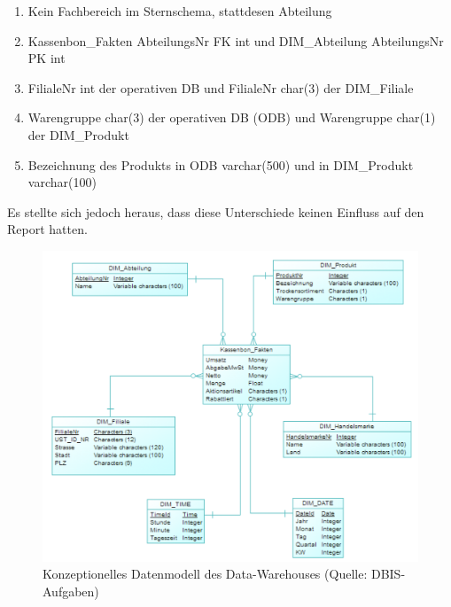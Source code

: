 \begin{enumerate}
  \item Kein Fachbereich im Sternschema, stattdesen Abteilung
  \item Kassenbon\_Fakten AbteilungsNr FK int und DIM\_Abteilung AbteilungsNr PK int
  \item FilialeNr int der operativen DB und FilialeNr char(3) der DIM\_Filiale
  \item Warengruppe char(3) der operativen DB (ODB) und Warengruppe char(1) der DIM\_Produkt
  \item Bezeichnung des Produkts in ODB varchar(500) und in DIM\_Produkt varchar(100)
\end{enumerate}

Es stellte sich jedoch heraus, dass diese Unterschiede keinen Einfluss auf den Report hatten.

\begin{figure}[ht!]
  \centering
  \includegraphics[width=1.1\linewidth]{pictures/dw_concept.png}
  \caption[Konzeptionelles Datenmodell des Data-Warehouses]{Konzeptionelles Datenmodell des Data-Warehouses (Quelle: DBIS-Aufgaben)}
  \label{dw_concept}
\end{figure}

